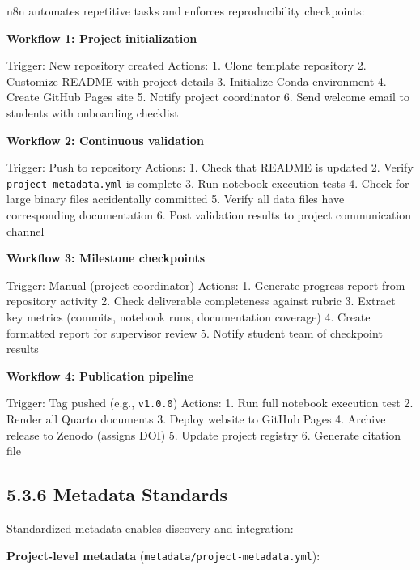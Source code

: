 \documentclass[
  oneside,
  open=any]{scrbook}
\begin{document}
n8n automates repetitive tasks and enforces reproducibility checkpoints:

\textbf{Workflow 1: Project initialization}

Trigger: New repository created Actions: 1. Clone template repository 2.
Customize README with project details 3. Initialize Conda environment 4.
Create GitHub Pages site 5. Notify project coordinator 6. Send welcome
email to students with onboarding checklist

\textbf{Workflow 2: Continuous validation}

Trigger: Push to repository Actions: 1. Check that README is updated 2.
Verify \texttt{project-metadata.yml} is complete 3. Run notebook
execution tests 4. Check for large binary files accidentally committed
5. Verify all data files have corresponding documentation 6. Post
validation results to project communication channel

\textbf{Workflow 3: Milestone checkpoints}

Trigger: Manual (project coordinator) Actions: 1. Generate progress
report from repository activity 2. Check deliverable completeness
against rubric 3. Extract key metrics (commits, notebook runs,
documentation coverage) 4. Create formatted report for supervisor review
5. Notify student team of checkpoint results

\textbf{Workflow 4: Publication pipeline}

Trigger: Tag pushed (e.g., \texttt{v1.0.0}) Actions: 1. Run full
notebook execution test 2. Render all Quarto documents 3. Deploy website
to GitHub Pages 4. Archive release to Zenodo (assigns DOI) 5. Update
project registry 6. Generate citation file

\subsection{5.3.6 Metadata Standards}\label{metadata-standards}

Standardized metadata enables discovery and integration:

\textbf{Project-level metadata}
(\texttt{metadata/project-metadata.yml}):
\end{document}
